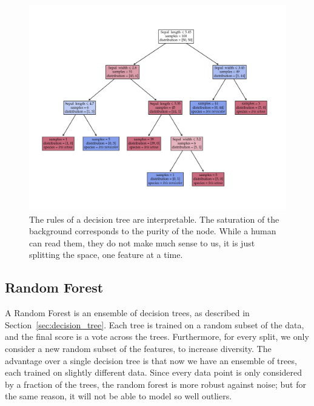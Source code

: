 \begin{figure}[tb] %
	\centering
	\hspace{-15mm} %
	\includegraphics[trim={10mm, 20mm, 15mm, 23mm}, clip, width=1.\textwidth]{machine_learning/figures/tree}
	\restoregeometry
	\caption{The rules of a decision tree are interpretable.
	The saturation of the background corresponds to the purity of the node.
	While a human can read them, they do not make much sense to us,
	it is just splitting the space, one feature at a time.\label{subfig:tree_explained}}
\end{figure}
\restoregeometry

\subsection{Random Forest}\label{sec:random_forest}
A Random Forest is an ensemble of decision trees, as described in Section~\ref{sec:decision_tree}.
Each tree is trained on a random subset of the data, and the final score is a vote across the trees.
Furthermore, for every split, we only consider a new random subset of the features, to increase diversity.
The advantage over a single decision tree is that now we have an ensemble of trees, each trained on slightly different data.
Since every data point is only considered by a fraction of the trees, the random forest is more robust against noise; but for the same reason, it will not be able to model so well outliers.



